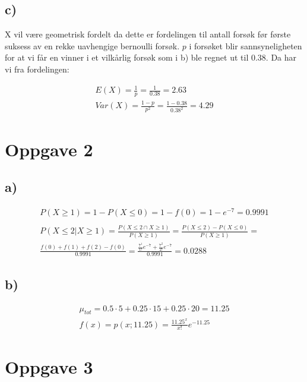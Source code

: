 \subsection*{c)}


X vil være geometrisk fordelt da dette er fordelingen til antall forsøk før første suksess av en rekke uavhengige bernoulli forsøk. $p$ i forsøket blir sannsyneligheten for at vi får en vinner i et vilkårlig forsøk som i b) ble regnet ut til 0.38. Da har vi fra fordelingen:

\begin{gather*}
	E(X) = \frac{1}{p} = \frac{1}{0.38} = 2.63
	\\
	Var(X) = \frac{1 - p}{p^2} = \frac{1 - 0.38}{0.38^2} = 4.29
\end{gather*}



\section*{Oppgave 2}


\subsection*{a)}


\begin{gather*}
	P(X \geq 1) = 1 - P(X \leq 0) = 1 - f(0) = 1 - e^{-7} = 0.9991
	\\
	\\
	P(X \leq 2 | X \geq 1) = \frac{P(X \leq 2 \cap X \geq 1)}{P(X \geq 1)}
	=
	\frac{P(X \leq 2) - P(X \leq 0)}{P(X \geq 1)}
	=
	\\
	\frac{f(0) + f(1) + f(2) - f(0)}{0.9991} = \frac{\frac{7^1}{1!} e^{-7} + \frac{7^2}{2!} e^{-7}}{0.9991} = 0.0288
\end{gather*}


\subsection*{b)}


\begin{gather*}
	\mu_{tot} = 0.5 \cdot 5 + 0.25 \cdot 15 + 0.25 \cdot 20 = 11.25
	\\
	f(x) = p(x; 11.25) = \frac{11.25^x}{x!} e^{-11.25}
\end{gather*}


\section*{Oppgave 3}


